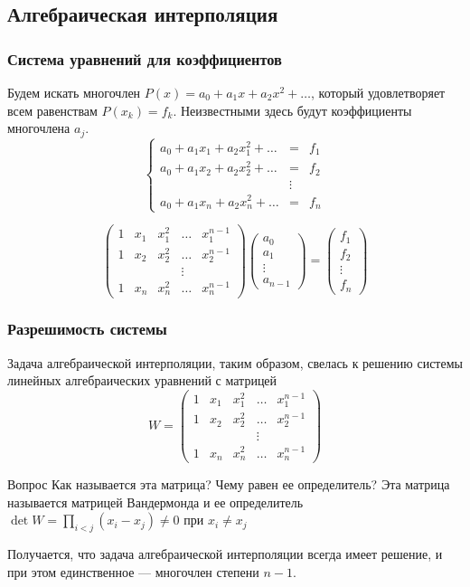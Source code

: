 \documentclass[aspectratio=43,unicode]{beamer}
\begin{document}
\subsection{Алгебраическая интерполяция}
\begin{frame}\frametitle{Система уравнений для коэффициентов}
	Будем искать многочлен $P(x) = a_0 + a_1 x + a_2 x^2 + \dots$, который удовлетворяет всем
	равенствам $P(x_k) = f_k$. Неизвестными здесь будут коэффициенты многочлена $a_j$.
	\pause
	\[
	\left\{
	\begin{array}{ccc}
	a_0 + a_1 x_1 + a_2 x_1^2 + \dots &=& f_1\\
	a_0 + a_1 x_2 + a_2 x_2^2 + \dots &=& f_2\\
	&\vdots&\\
	a_0 + a_1 x_n + a_2 x_n^2 + \dots &=& f_n
	\end{array}
	\right.
	\]

	\pause
	\[
	\begin{pmatrix}
		1&x_1&x_1^2& \dots & x_1^{n-1}\\
		1&x_2&x_2^2& \dots & x_2^{n-1}\\
		&&&\vdots\\
		1&x_n&x_n^2& \dots & x_n^{n-1}
	\end{pmatrix}
	\begin{pmatrix}
		a_0\\a_1\\\vdots\\a_{n-1}
	\end{pmatrix}
	 =
	\begin{pmatrix}
		f_1\\f_2\\\vdots\\f_n
	\end{pmatrix}
	\]
\end{frame}

\begin{frame}
\frametitle{Разрешимость системы}
	Задача алгебраической интерполяции, таким образом, свелась
	к решению системы линейных алгебраических уравнений с матрицей
	\[
	W = \begin{pmatrix}
		1&x_1&x_1^2& \dots & x_1^{n-1}\\
		1&x_2&x_2^2& \dots & x_2^{n-1}\\
		&&&\vdots\\
		1&x_n&x_n^2& \dots & x_n^{n-1}
	\end{pmatrix}
	\]
	\begin{block}{Вопрос}
		Как называется эта матрица? Чему равен ее определитель?
		\pause
		Эта матрица называется матрицей Вандермонда и ее определитель $\det W ={\prod}_{i<j}  (x_i-x_j) \neq 0$ при $x_i \neq x_j$
	\end{block}
	Получается, что задача алгебраической интерполяции всегда имеет решение, и при этом единственное --- многочлен степени $n-1$.
\end{frame}
\end{document}
